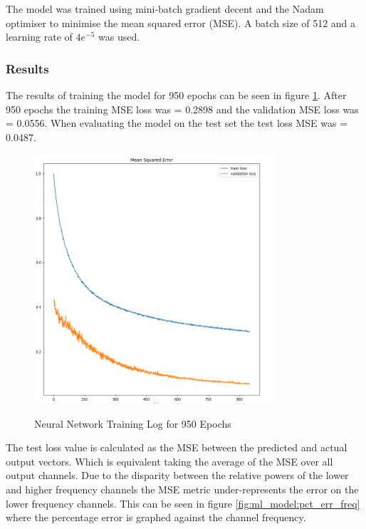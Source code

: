 The model was trained using mini-batch gradient decent and the Nadam optimiser to minimise the mean squared error (MSE). A batch size of 512 and a learning rate of $4e^{-5}$ was used.


\subsubsection{Results}
\FloatBarrier


The results of training the model for 950 epochs can be seen in figure \ref{fig:ml_model:nn_training}. After 950 epochs the training MSE loss was = 0.2898 and the validation MSE loss was = 0.0556. When evaluating the model on the test set the test loss MSE was = 0.0487. 




\begin{figure}[!h]
    \centering
    \caption{Neural Network Training Log for 950 Epochs}
    \includegraphics[width = 0.8\textwidth]{project/img/ml_model/combined_model_training_log.png}
    \label{fig:ml_model:nn_training}
\end{figure}


The test loss value is calculated as the MSE between the predicted and actual output vectors. Which is equivalent taking the average of the MSE over all output channels. Due to the disparity between the relative powers of the lower and higher frequency channels the MSE metric under-represents the error on the lower frequency channels. This can be seen in figure \ref{fig:ml_model:pct_err_freq} where the percentage error is graphed against the channel frequency.

